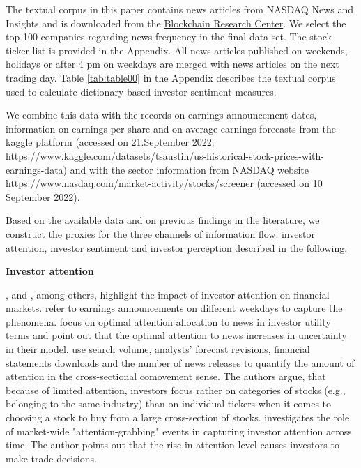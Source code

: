 \documentclass[11pt]{article}
\begin{document}
The textual corpus in this paper contains news articles from NASDAQ News and Insights and is downloaded from the \href{https://blockchain-research-center.com/}{Blockchain Research Center}. We select the top 100 companies regarding news frequency in the final data set. The stock ticker list is provided in the Appendix. All news articles published on weekends, holidays or after 4 pm on weekdays are merged with news articles on the next trading day.
Table \ref{tab:table00} in the Appendix describes the textual corpus used to calculate dictionary-based investor sentiment measures.


We combine this data with the records on earnings announcement dates, information on earnings per share and on average earnings forecasts from the kaggle platform (accessed on
21.September 2022: 
https://www.kaggle.com/datasets/tsaustin/us-historical-stock-prices-with-earnings-data) and with the sector information from NASDAQ website https://www.nasdaq.com/market-activity/stocks/screener (accessed on 10 September 2022).

Based on the available data and on previous findings in the literature, we construct the proxies for the three channels of information flow: investor attention, investor sentiment and investor perception described in the following.

\vspace{0.5cm}
{\bf {Investor attention}}

\cite{chen2022},  \cite{daniel2020} and \cite{dellavigna2009}, among others, highlight the impact of investor attention on financial markets. \cite{dellavigna2009} refer to earnings announcements on different weekdays to capture the phenomena. \cite{daniel2020} focus on optimal attention allocation to news in investor utility terms and point out that the optimal attention to news increases in uncertainty in their model. \cite{drake2017} use search volume, analysts' forecast revisions, financial statements downloads and the number of news releases to quantify the amount of attention in the cross-sectional comovement sense. The authors argue, that because of limited attention, investors focus rather on categories of stocks (e.g., belonging to the same industry) than on individual tickers when it comes to choosing a stock to buy from a large cross-section of stocks. \cite{YUAN2015} investigates the role of market-wide "attention-grabbing" events in capturing investor attention across time. The author points out that the rise in attention level causes investors to make trade decisions.
\end{document}
